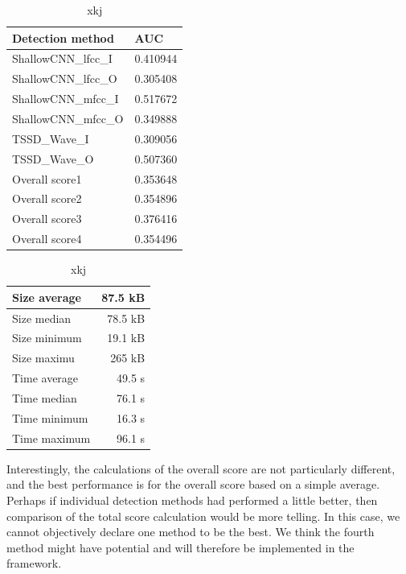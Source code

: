 \begin{table}[H]
    \begin{minipage}[c]{.5\textwidth}
        \centering
        \begin{tabular}{|l|r|}
            \hline
            Detection method & \multicolumn{1}{l|}{AUC} \\ \hline
            ShallowCNN\_lfcc\_I & 0.410944 \\ \hline
            ShallowCNN\_lfcc\_O & 0.305408 \\ \hline
            ShallowCNN\_mfcc\_I & 0.517672 \\ \hline
            ShallowCNN\_mfcc\_O & 0.349888 \\ \hline
            TSSD\_Wave\_I & 0.309056 \\ \hline
            TSSD\_Wave\_O & 0.507360 \\ \hline
            Overall score1 & 0.353648 \\ \hline
            Overall score2 & 0.354896 \\ \hline
            Overall score3 & 0.376416 \\ \hline
            Overall score4 & 0.354496 \\ \hline
        \end{tabular}
        \caption{xkj}
    \end{minipage}
    \begin{minipage}[c]{.5\textwidth}
        \centering
        \begin{tabular}{|l|r|}
            \hline
            Size average & 87.5 kB \\ \hline
            Size median & 78.5 kB \\ \hline
            Size minimum & 19.1 kB \\ \hline
            Size maximu & 265 kB \\ \hline
            Time average & 49.5 s \\ \hline
            Time median & 76.1 s \\ \hline
            Time minimum & 16.3 s \\ \hline
            Time maximum & 96.1 s \\ \hline
        \end{tabular}
        \caption{xkj}
    \end{minipage}
\end{table}

Interestingly, the calculations of the overall score are not particularly different, and the best performance is for the overall score based on a simple average. Perhaps if individual detection methods had performed a little better, then comparison of the total score calculation would be more telling. In this case, we cannot objectively declare one method to be the best. We think the fourth method might have potential and will therefore be implemented in the framework. 

